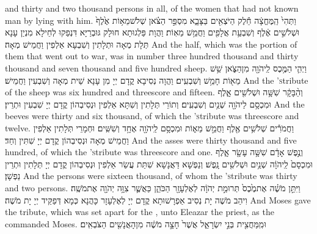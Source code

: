 {and thirty and two thousand persons in all, of the women that had not known man by lying with him.}{}
{וַתְּהִי֙ הַֽמֶּחֱצָ֔ה חֵ֕לֶק הַיֹּצְאִ֖ים בַּצָּבָ֑א מִסְפַּ֣ר הַצֹּ֗אן שְׁלֹשׁ\maqqaf מֵא֥וֹת אֶ֙לֶף֙ וּשְׁלֹשִׁ֣ים אֶ֔לֶף וְשִׁבְעַ֥ת אֲלָפִ֖ים וַחֲמֵ֥שׁ מֵאֽוֹת׃}
{וַהֲוָת פַּלְגוּתָא חוּלָק גּוּבְרַיָּא דִּנְפַקוּ לְחֵילָא מִנְיַן עָנָא תְּלָת מְאָה וּתְלָתִין וְשִׁבְעָא אַלְפִין וַחֲמֵישׁ מְאָה׃}
{And the half, which was the portion of them that went out to war, was in number three hundred thousand and thirty thousand and seven thousand and five hundred sheep.}{}
{וַיְהִ֛י הַמֶּ֥כֶס לַֽיהֹוָ֖ה מִן\maqqaf הַצֹּ֑אן שֵׁ֥שׁ מֵא֖וֹת חָמֵ֥שׁ וְשִׁבְעִֽים׃}
{וַהֲוָה נְסִיבָא קֳדָם יְיָ מִן עָנָא שֵׁית מְאָה וְשִׁבְעִין וַחֲמֵישׁ׃}
{And the \lord\textsc{’s}\space tribute of the sheep was six hundred and threescore and fifteen.}{}
{וְהַ֨בָּקָ֔ר שִׁשָּׁ֥ה וּשְׁלֹשִׁ֖ים אָ֑לֶף וּמִכְסָ֥ם לַיהֹוָ֖ה שְׁנַ֥יִם וְשִׁבְעִֽים׃}
{וְתוֹרֵי תְּלָתִין וְשִׁתָּא אַלְפִין וּנְסִיבְהוֹן קֳדָם יְיָ שִׁבְעִין וּתְרֵין׃}
{And the beeves were thirty and six thousand, of which the \lord\textsc{’s}\space tribute was threescore and twelve.}{}
{וַחֲמֹרִ֕ים שְׁלֹשִׁ֥ים אֶ֖לֶף וַחֲמֵ֣שׁ מֵא֑וֹת וּמִכְסָ֥ם לַֽיהֹוָ֖ה אֶחָ֥ד וְשִׁשִּֽׁים׃}
{וּחְמָרֵי תְּלָתִין אַלְפִין וַחֲמֵישׁ מְאָה וּנְסִיבְהוֹן קֳדָם יְיָ שִׁתִּין וְחַד׃}
{And the asses were thirty thousand and five hundred, of which the \lord\textsc{’s}\space tribute was threescore and one.}{}
{וְנֶ֣פֶשׁ אָדָ֔ם שִׁשָּׁ֥ה עָשָׂ֖ר אָ֑לֶף וּמִכְסָם֙ לַֽיהֹוָ֔ה שְׁנַ֥יִם וּשְׁלֹשִׁ֖ים נָֽפֶשׁ׃}
{וְנַפְשָׁא דַּאֲנָשָׁא שִׁתַּת עֲשַׂר אַלְפִין וּנְסִיבְהוֹן קֳדָם יְיָ תְּלָתִין וּתְרֵין נַפְשָׁן׃}
{And the persons were sixteen thousand, of whom the \lord\textsc{’s}\space tribute was thirty and two persons.}{}
{וַיִּתֵּ֣ן מֹשֶׁ֗ה אֶת\maqqaf מֶ֙כֶס֙ תְּרוּמַ֣ת יְהֹוָ֔ה לְאֶלְעָזָ֖ר הַכֹּהֵ֑ן כַּאֲשֶׁ֛ר צִוָּ֥ה יְהֹוָ֖ה אֶת\maqqaf מֹשֶֽׁה׃}
{וִיהַב מֹשֶׁה יָת נְסִיב אַפְרָשׁוּתָא קֳדָם יְיָ לְאֶלְעָזָר כָּהֲנָא כְּמָא דְּפַקֵּיד יְיָ יָת מֹשֶׁה׃}
{And Moses gave the tribute, which was set apart for the \lord, unto Eleazar the priest, as the \lord\space commanded Moses.}{}
{וּמִֽמַּחֲצִ֖ית בְּנֵ֣י יִשְׂרָאֵ֑ל אֲשֶׁר֙ חָצָ֣ה מֹשֶׁ֔ה מִן\maqqaf הָאֲנָשִׁ֖ים הַצֹּבְאִֽים׃}
